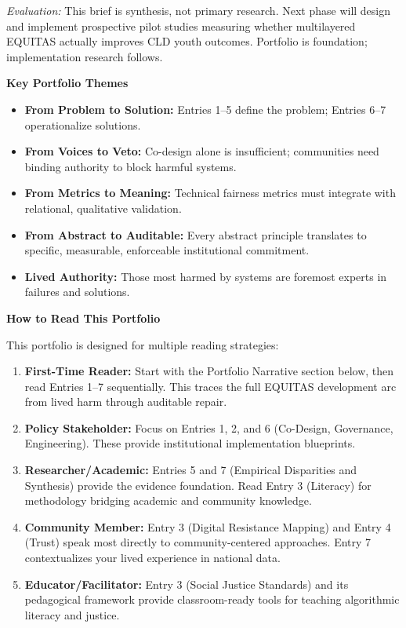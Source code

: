 \documentclass[11pt,twoside]{article}
\begin{document}
\vspace{0.1cm}

\noindent \hspace{1cm} \textit{Evaluation:} This brief is synthesis, not primary research. Next phase will design and implement prospective pilot studies measuring whether multilayered EQUITAS actually improves CLD youth outcomes. Portfolio is foundation; implementation research follows.

\vspace{1cm}

\noindent \textbf{\large Key Portfolio Themes}

\begin{itemize}
\item \textbf{From Problem to Solution:} Entries 1--5 define the problem; Entries 6--7 operationalize solutions.
\item \textbf{From Voices to Veto:} Co-design alone is insufficient; communities need binding authority to block harmful systems.
\item \textbf{From Metrics to Meaning:} Technical fairness metrics must integrate with relational, qualitative validation.
\item \textbf{From Abstract to Auditable:} Every abstract principle translates to specific, measurable, enforceable institutional commitment.
\item \textbf{Lived Authority:} Those most harmed by systems are foremost experts in failures and solutions.
\end{itemize}

\vspace{1cm}

\noindent \textbf{\large How to Read This Portfolio}

\noindent This portfolio is designed for multiple reading strategies:

\begin{enumerate}
\item \textbf{First-Time Reader:} Start with the Portfolio Narrative section below, then read Entries 1--7 sequentially. This traces the full EQUITAS development arc from lived harm through auditable repair.

\item \textbf{Policy Stakeholder:} Focus on Entries 1, 2, and 6 (Co-Design, Governance, Engineering). These provide institutional implementation blueprints.

\item \textbf{Researcher/Academic:} Entries 5 and 7 (Empirical Disparities and Synthesis) provide the evidence foundation. Read Entry 3 (Literacy) for methodology bridging academic and community knowledge.

\item \textbf{Community Member:} Entry 3 (Digital Resistance Mapping) and Entry 4 (Trust) speak most directly to community-centered approaches. Entry 7 contextualizes your lived experience in national data.

\item \textbf{Educator/Facilitator:} Entry 3 (Social Justice Standards) and its pedagogical framework provide classroom-ready tools for teaching algorithmic literacy and justice.
\end{enumerate}
\end{document}
